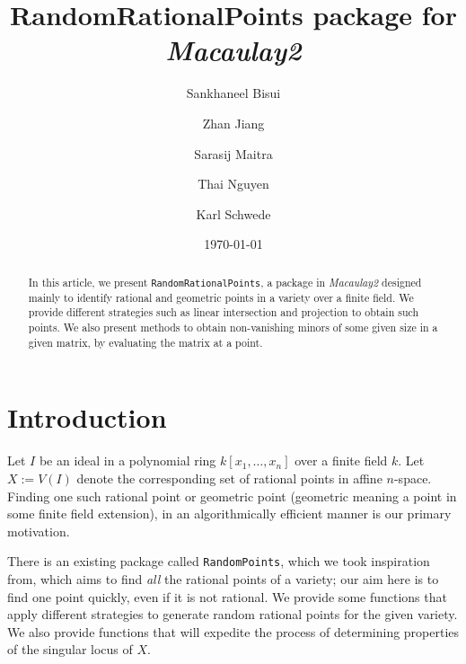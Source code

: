 \documentclass[11pt]{amsart}
\theoremstyle{definition}
\begin{document}
\title{{RandomRationalPoints} package for \emph{Macaulay2}}
\author{Sankhaneel Bisui}
\address{Tulane University}
\author{Zhan Jiang}
\address{University of Michigan}
\author{Sarasij Maitra}
\address{University of Virginia}
\author{Thai Nguyen}
\address{Tulane University}
\author{Karl Schwede}
\address{Department of Mathematics, University of Utah, 155 S 1400 E Room 233, Salt Lake City, UT, 84112}
\date{\today}

\begin{abstract}
  In this article, we present {\tt RandomRationalPoints}, a package in \emph{Macaulay2} designed mainly to identify rational and geometric points in a variety over a finite field. We provide different strategies such as linear intersection and projection to obtain such points. We also present methods to obtain non-vanishing minors of some given size in a given matrix, by evaluating the matrix at a point.  %
\end{abstract}



\maketitle

\section{Introduction}
    Let $I$ be an ideal in a polynomial ring $k[x_1,\dots, x_n]$ over a finite field $k$. Let $X:=V(I)$ denote the corresponding set of rational points in affine $n$-space. Finding one such rational point or geometric point (geometric meaning a point in some finite field extension), in an algorithmically efficient manner is our primary motivation. 

    There is an existing package called {\tt RandomPoints}, which we took inspiration from, which aims to find \emph{all} the rational points of a variety; our aim here is to find one point quickly, even if it is not rational.  
    We provide some functions that apply different strategies to generate random rational points for the given variety. We also provide functions that will expedite the process of determining properties of the singular locus of $X$.%
\end{document}
